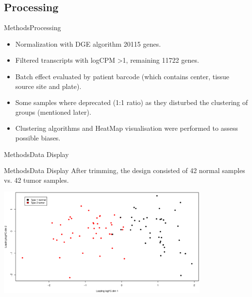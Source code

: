 \documentclass{beamer}
\begin{document}
\subsection{Processing}
\begin{frame}{Methods}{Processing}
	\begin{itemize}
		\item Normalization with DGE algorithm \cite{Robinson01012010} 20115 genes.
		\item Filtered transcripts with logCPM \textgreater 1, remaining 11722 genes.
		\item Batch effect evaluated by patient barcode  (which contains center, tissue source site and plate).
		\item Some samples where deprecated (1:1 ratio) as they disturbed the clustering of groups (mentioned later).
		\item Clustering algorithms and HeatMap visualisation were performed to assess possible biases.
	\end{itemize}

\end{frame}

\begin{frame}{Methods}{Data Display}
	\centering
	
	
  
\end{frame}

\begin{frame}{Methods}{Data Display}
  After trimming, the design consisted of 42 normal samples vs. 42 tumor samples.
  \centering
  
  \includegraphics[width=0.8\textwidth,height=0.8\textheight,keepaspectratio]{mds4-1.eps}

\end{frame}
\end{document}
